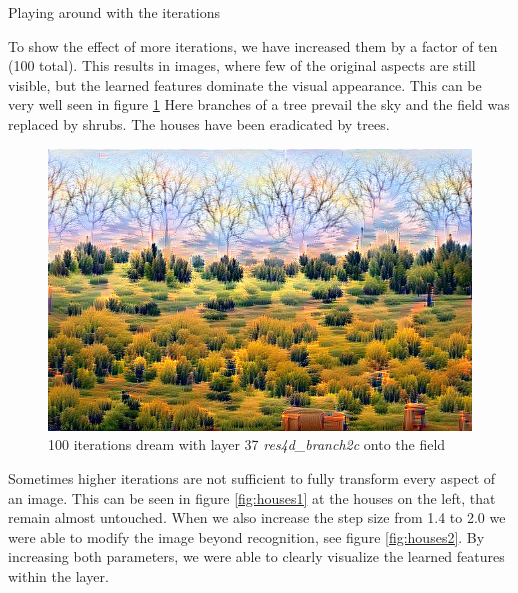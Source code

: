 Playing around with the iterations

To show the effect of more iterations, we have increased them by a factor of ten (100 total).
This results in images, where few of the original aspects are still visible, but the learned features dominate the visual appearance.
This can be very well seen in figure \ref{fig:baum}
Here branches of a tree prevail the sky and the field was replaced by shrubs.
The houses have been eradicated by trees.

\begin{figure}[H]
	\centering
	\includegraphics[width=0.7\linewidth]{img/baum}
	\caption{100 iterations dream with layer 37 \emph{res4d\_branch2c} onto the field}
	\label{fig:baum}
\end{figure}

Sometimes higher iterations are not sufficient to fully transform every aspect of an image.
This can be seen in figure \ref{fig:houses1} at the houses on the left, that remain almost untouched.
When we also increase the step size from 1.4 to 2.0 we were able to modify the image beyond recognition, see figure \ref{fig:houses2}.
By increasing both parameters, we were able to clearly visualize the learned features within the layer.


